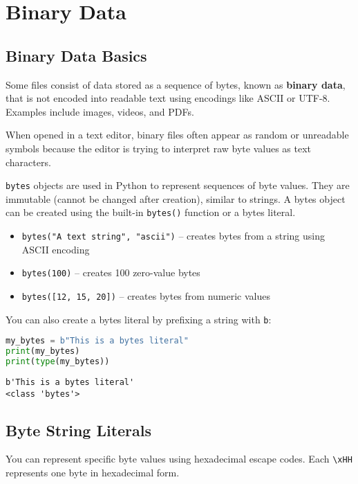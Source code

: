 \chapter{Binary Data}

\section*{Binary Data Basics}
Some files consist of data stored as a sequence of bytes, known as \textbf{binary data}, 
that is not encoded into readable text using encodings like ASCII or UTF-8. 
Examples include images, videos, and PDFs.

When opened in a text editor, binary files often appear as random or unreadable symbols because 
the editor is trying to interpret raw byte values as text characters.

\texttt{bytes} objects are used in Python to represent sequences of byte values. 
They are immutable (cannot be changed after creation), similar to strings. 
A bytes object can be created using the built-in \texttt{bytes()} function or a bytes literal.

\begin{itemize}
  \item \texttt{bytes("A text string", "ascii")} – creates bytes from a string using ASCII encoding
  \item \texttt{bytes(100)} – creates 100 zero-value bytes
  \item \texttt{bytes([12, 15, 20])} – creates bytes from numeric values
\end{itemize}

You can also create a bytes literal by prefixing a string with \texttt{b}:

\begin{lstlisting}[language=Python, caption={Creating a bytes object using a literal.}]
my_bytes = b"This is a bytes literal"
print(my_bytes)
print(type(my_bytes))
\end{lstlisting}

\begin{verbatim}
b'This is a bytes literal'
<class 'bytes'>
\end{verbatim}

\section*{Byte String Literals}
You can represent specific byte values using hexadecimal escape codes. 
Each \texttt{\textbackslash xHH} represents one byte in hexadecimal form.

